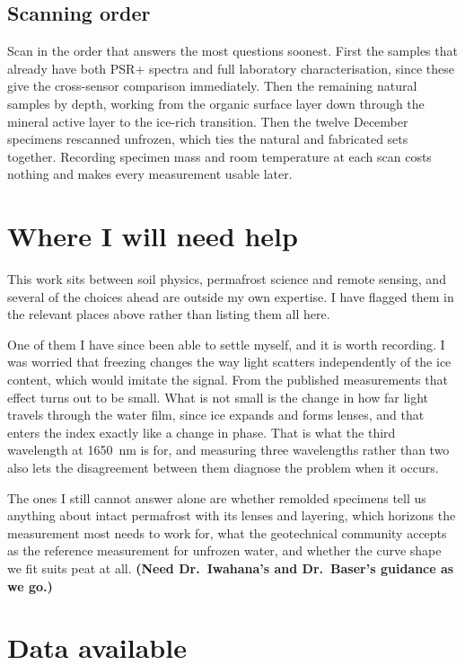 \documentclass[11pt]{article}
\begin{document}
\subsection{Scanning order}

Scan in the order that answers the most questions soonest. First the samples
that already have both PSR+ spectra and full laboratory characterisation, since
these give the cross-sensor comparison immediately. Then the remaining natural
samples by depth, working from the organic surface layer down through the
mineral active layer to the ice-rich transition. Then the twelve December
specimens rescanned unfrozen, which ties the natural and fabricated sets
together. Recording specimen mass and room temperature at each scan costs
nothing and makes every measurement usable later.

\section{Where I will need help}

This work sits between soil physics, permafrost science and remote sensing, and
several of the choices ahead are outside my own expertise. I have flagged them
in the relevant places above rather than listing them all here.

One of them I have since been able to settle myself, and it is worth recording.
I was worried that freezing changes the way light scatters independently of the
ice content, which would imitate the signal. From the published measurements
that effect turns out to be small. What is not small is the change in how far
light travels through the water film, since ice expands and forms lenses, and
that enters the index exactly like a change in phase. That is what the third
wavelength at \SI{1650}{\nano\meter} is for, and measuring three wavelengths
rather than two also lets the disagreement between them diagnose the problem
when it occurs.

The ones I still cannot answer alone are whether remolded specimens tell us
anything about intact permafrost with its lenses and layering, which horizons
the measurement most needs to work for, what the geotechnical community accepts
as the reference measurement for unfrozen water, and whether the curve shape we
fit suits peat at all. \textbf{(Need Dr.\ Iwahana's and Dr.\ Baser's guidance as
we go.)}

\section{Data available}
\end{document}
